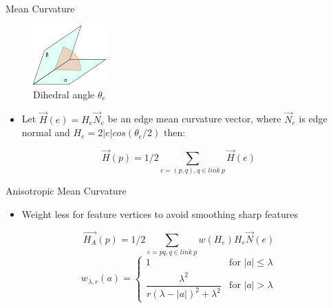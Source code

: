 \documentclass{beamer}
\begin{document}
\begin{frame}{Mean Curvature}
\begin{figure}[htb]
\centering
\includegraphics[width=0.25\textwidth]{Dihedral_angle.png}
\caption{Dihedral angle $\theta_e$}
\label{fig:dihedral}
\end{figure}
\begin{itemize}
	\item Let $\vec{H}(e) = H_e \vec{N}_e$ be an edge mean curvature vector, where $\vec{N}_e$ is edge normal and $H_e = 2|e|cos(\theta_e/2)$ then:
\end{itemize}
\begin{equation*}
\vec{H}(p) = 1/2\sum\limits_{e=(p, q), q \in link\ p}{\vec{H}(e)}
\end{equation*}
\end{frame}

\begin{frame}{Anisotropic Mean Curvature}
\begin{itemize}
	\item Weight less for feature vertices to avoid smoothing sharp features
\end{itemize}
\begin{equation*}
\vec{H_A}(p) = 1/2\sum\limits_{e=pq, q \in link\ p}{w(H_e)H_e \vec{N}(e)}
\end{equation*}
\begin{equation*}
w_{\lambda, r}(a) = 
\begin{cases}
1 & \text{for } |a| \leq \lambda \\
\dfrac{\lambda^2}{r(\lambda - |a|)^2+\lambda^2} & \text{for } |a| > \lambda
\end{cases}
\end{equation*}
\end{frame}
\end{document}
